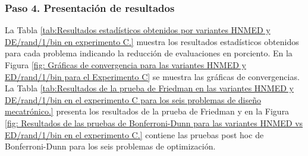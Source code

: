 \begin{table}[H]
	\centering
	\caption{Tamaños de población utilizados para cada problema en el Experimento C.}
	\label{tab:Tamaños de población utilizados para cada problema en el Experimento C.}
\end{table}


\subsubsection{Paso 4. Presentación de resultados}
La Tabla \ref{tab:Resultados estadísticos obtenidos por variantes HNMED y DE/rand/1/bin  en experimento C.} muestra los resultados estadísticos obtenidos para cada problema indicando la reducción de evaluaciones en porciento. En la Figura \ref{fig: Gráficas de convergencia para las variantes HNMED y ED/rand/1/bin para el Experimento C} se muestra las gráficas de convergencias. La Tabla \ref{tab:Resultados de la prueba de Friedman en las variantes HNMED y DE/rand/1/bin en el experimento C para los seis problemas de diseño mecatrónico.} presenta los resultados de la prueba de Friedman y en la Figura \ref{fig: Resultados de las pruebas de Bonferroni-Dunn para las variantes HNMED vs ED/rand/1/bin en el experimento C.} contiene las pruebas post hoc de Bonferroni-Dunn para los seis problemas de optimización.


